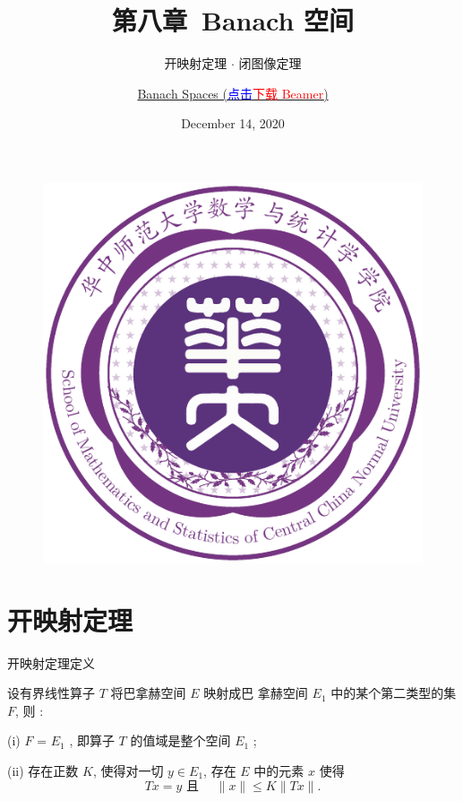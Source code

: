 \documentclass[sans,mathserif]{beamer} %
\author{\href{https://latexstudio.net/index/details/index/mid/993.html}{Banach Spaces (\textcolor{blue}{点击}\textcolor{red}{下载 Beamer})}}
\title{第八章~Banach 空间}
\subtitle{开映射定理 $\cdot$ 闭图像定理}
\institute{华中师范大学数学与统计学学院}
\date{December 14, 2020}
\begin{document}
\kaishu
\begin{frame}
	\titlepage
	\begin{figure}[htpb]
		\begin{center}
			\includegraphics[width=0.2\linewidth]{MSSCCMUlogo.pdf}
		\end{center}
	\end{figure}
\end{frame}
\begin{frame}
\tableofcontents[sectionstyle=show,subsectionstyle=show/shaded/hide,subsubsectionstyle=show/shaded/hide]
\end{frame}

\section{开映射定理}

\begin{frame}[allowframebreaks]{开映射定理定义}
	
	\begin{theorem}[开映射定理]
		
		设有界线性算子 $T$ 将巴拿赫空间 $E$ 映射成巴
拿赫空间 $E_{1}$ 中的某个第二类型的集 $F$, 则 :

  (i) $F$ = $E_{1}$ , 即算子 $T$ 的值域是整个空间 $E_{1}$ ;

  (ii) 存在正数 $K$, 使得对一切 $y \in E_{1}$, 存在 $E$ 中的元素 $x$ 使得
  \begin{equation}
	T x=y \text{ 且 } \quad\|x\| \leq K\|T x\| .
\end{equation}
	
\end{theorem}
\end{frame}
\end{document}
